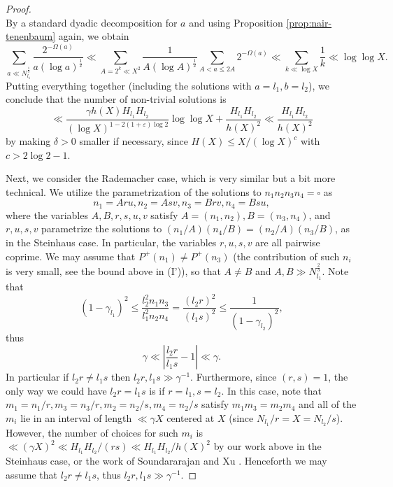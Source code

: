 \documentclass[11pt]{tran-l}
\theoremstyle{definition}
\theoremstyle{remark}
\numberwithin{equation}{section}
\begin{document}
\begin{proof}
\begin{equation}
\end{equation}
By a standard dyadic decomposition for $a$ and using Proposition \ref{prop:nair-tenenbaum} again, we obtain 
\begin{equation*}
    \sum_{a\ll N_{l_1}^{\frac{1}{3}}} \frac{2^{-\Omega(a)}}{a(\log a)^{\frac{1}{2}}} \ll \sum_{A=2^k\ll X^2 }\frac{1}{A (\log A)^{\frac{1}{2}}}\sum_{A<a\leq 2A }2^{-\Omega(a)}  \ll \sum_{k\ll \log X}\frac{1}{k}\ll \log \log X.
\end{equation*}
 Putting everything together (including the solutions with $a=l_1, b=l_2$), we conclude that the number of non-trivial solutions is 
\begin{equation*}
    \ll \frac{\gamma h(X)H_{l_1}H_{l_2}}{(\log X)^{1-2(1+\varepsilon)\log 2}}\log\log X + \frac{H_{l_1}H_{l_2}}{h(X)^2}\ll \frac{H_{l_1}H_{l_2}}{h(X)^2}
\end{equation*}
by making $\delta>0$ smaller if necessary, since $H(X)\leq X/(\log X)^c$ with $c>2\log 2 -1$. 


Next, we consider the Rademacher case, which is very similar but a bit more technical. We utilize the parametrization of the solutions to $n_1n_2n_3n_4=\square$ as 
    \begin{equation*}
        n_1 = Aru, n_2 = Asv, n_3 =Brv, n_4 = Bsu,
    \end{equation*}
    where the variables $A, B, r, s, u, v$ satisfy $A = (n_1, n_2), B = (n_3, n_4)$, and $r, u, s, v$ parametrize the solutions to $(n_1/A)(n_4/B) = (n_2/A)(n_3/B)$, as in the Steinhaus case. In particular, the variables $r, u, s, v$ are all pairwise coprime. We may assume that $P^+(n_1)\neq P^+(n_3)$ (the contribution of such $n_i$ is very small, see the bound above in (I')), so that $A\neq B$ and $A, B\gg N_{l_1}^{\frac{2}{3}}$. Note that 
    \begin{equation*}
        (1-\gamma_{l_1})^2\leq \frac{l_2^2n_1n_3}{l_1^2 n_2n_4} = \frac{(l_2r)^2}{(l_1s)^2}\leq \frac{1}{(1-\gamma_{l_2})^2},
    \end{equation*} thus 
    \begin{equation}\label{eq:r,s,gamma}
        \gamma \ll \left\lvert \frac{l_2r}{l_1s} - 1 \right\rvert \ll \gamma.
    \end{equation} In particular if $l_2r\neq l_1s$ then $l_2r, l_1s\gg \gamma^{-1}$. Furthermore, since $(r, s)=1$, the only way we could have $l_2r=l_1s$ is if $r=l_1, s=l_2$. In this case, note that $m_1 = n_1/r, m_3 =n_3/r, m_2=n_2/s, m_4=n_2/s$ satisfy $m_1m_3=m_2m_4$ and all of the $m_i$ lie in an interval of length $\ll \gamma X$ centered at $X$ (since $N_{l_1}/r = X=N_{l_2}/s$). However, the number of choices for such $m_i$ is $\ll (\gamma X)^2\ll H_{l_1}H_{l_2}/(rs)\ll H_{l_1}H_{l_2}/h(X)^2$ by our work above in the Steinhaus case, or the work of Soundararajan and Xu \cite{soundararajan2023clt}. Henceforth we may assume that $l_2r\neq l_1s$, thus $l_2r, l_1s\gg \gamma^{-1}$. 
    

\end{proof}
\end{document}
